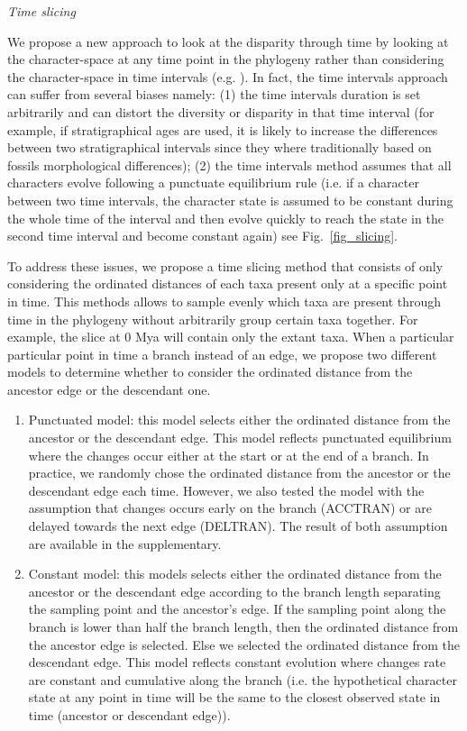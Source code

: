 \documentclass[12pt,letterpaper]{article}
\renewcommand{\subsection}[1]{%
\bigskip
\begin{center}
\begin{large}
\normalfont\itshape #1
\end{large}
\end{center}}
\begin{document}
\subsection{Time slicing}
We propose a new approach to look at the disparity through time by looking at the character-space at any time point in the phylogeny rather than considering the character-space in time intervals (e.g. \cite{Brusatte12092008,brusattedinosaur2012,toljagictriassic-jurassic2013}). In fact, the time intervals approach can suffer from several biases namely: (1) the time intervals duration is set arbitrarily and can distort the diversity or disparity in that time interval (for example, if stratigraphical ages are used, it is likely to increase the differences between two stratigraphical intervals since they where traditionally based on fossils morphological differences); (2) the time intervals method assumes that all characters evolve following a punctuate equilibrium rule (i.e. if a character between two time intervals, the character state is assumed to be constant during the whole time of the interval and then evolve quickly to reach the state in the second time interval and become constant again) see Fig.~\ref{fig_slicing}.

To address these issues, we propose a time slicing method that consists of only considering the ordinated distances of each taxa present only at a specific point in time. This methods allows to sample evenly which taxa are present through time in the phylogeny without arbitrarily group certain taxa together. For example, the slice at 0 Mya will contain only the extant taxa. When a particular particular point in time a branch instead of an edge, we propose two different models to determine whether to consider the ordinated distance from the ancestor edge or the descendant one.
\begin{enumerate}
\item{Punctuated model:} this model selects either the ordinated distance from the ancestor or the descendant edge. This model reflects punctuated equilibrium where the changes occur either at the start or at the end of a branch. In practice, we randomly chose the ordinated distance from the ancestor or the descendant edge each time. However, we also tested the model with the assumption that changes occurs early on the branch (ACCTRAN) or are delayed towards the next edge (DELTRAN). The result of both assumption are available in the supplementary.
\item{Constant model:} this models selects either the ordinated distance from the ancestor or the descendant edge according to the branch length separating the sampling point and the ancestor's edge. If the sampling point along the branch is lower than half the branch length, then the ordinated distance from the ancestor edge is selected. Else we selected the ordinated distance from the descendant edge. This model reflects constant evolution where changes rate are constant and cumulative along the branch (i.e. the hypothetical character state at any point in time will be the same to the closest observed state in time (ancestor or descendant edge)).
\end{enumerate}
\end{document}
